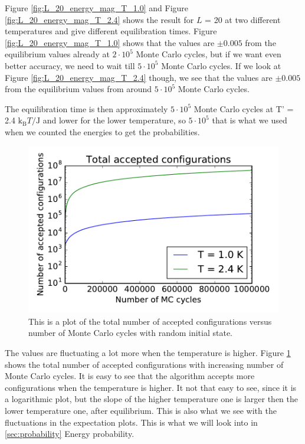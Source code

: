 Figure \ref{fig:L_20_energy_mag_T_1.0} and Figure \ref{fig:L_20_energy_mag_T_2.4} shows the result for $L$ = 20 at two different temperatures and give different equilibration times. Figure \ref{fig:L_20_energy_mag_T_1.0} shows that the values are $\pm 0.005$ from the equilibrium values already at $2\cdot 10^5$ Monte Carlo cycles, but if we want even better accuracy, we need to wait till $5\cdot 10^5$ Monte Carlo cycles. If we look at Figure \ref{fig:L_20_energy_mag_T_2.4} though, we see that the values are $\pm 0.005$ from the equilibrium values from around $5\cdot 10^5$ Monte Carlo cycles.

The equilibration time is then approximately $5\cdot 10^5$ Monte Carlo cycles at T' = 2.4 $\text{k}_\text{B}T/\text{J}$ and lower for the lower temperature, so $5\cdot 10^5$ that is what we used when we counted the energies to get the probabilities. 

\begin{figure}[H]
\includegraphics[width=\linewidth]{../results/4c/L_20_total_accepted}\caption{This is a plot of the total number of accepted configurations versus number of Monte Carlo cycles with random initial state.}\label{fig:total_accepted}
\end{figure}

The values are fluctuating a lot more when the temperature is higher. Figure \ref{fig:total_accepted} shows the total number of accepted configurations with increasing number of Monte Carlo cycles. It is easy to see that the algorithm accepts more configurations when the temperature is higher. It not that easy to see, since it is a logarithmic plot, but the slope of the higher temperature one is larger then the lower temperature one, after equilibrium. This is also what we see with the fluctuations in the expectation plots. This is what we will look into in \ref{sec:probability} Energy probability.


